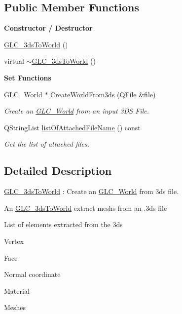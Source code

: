\subsection*{Public Member Functions}
\begin{Indent}{\bf Constructor / Destructor}\par
\begin{DoxyCompactItemize}
\item 
\hyperlink{class_g_l_c__3ds_to_world_a0ba29e8681e634a6ed41fbc696bd4b41}{G\-L\-C\-\_\-3ds\-To\-World} ()
\item 
virtual \hyperlink{class_g_l_c__3ds_to_world_a6bccd12d9499bafb012c33ce09fa7f0c}{$\sim$\-G\-L\-C\-\_\-3ds\-To\-World} ()
\end{DoxyCompactItemize}
\end{Indent}
\begin{Indent}{\bf Set Functions}\par
\begin{DoxyCompactItemize}
\item 
\hyperlink{class_g_l_c___world}{G\-L\-C\-\_\-\-World} $\ast$ \hyperlink{class_g_l_c__3ds_to_world_ab09c0eb5e5decddb6404461bc1b9a1cd}{Create\-World\-From3ds} (Q\-File \&\hyperlink{uavobjecttemplate_8m_a97c04efa65bcf0928abf9260bc5cbf46}{file})
\begin{DoxyCompactList}\small\item\em Create an \hyperlink{class_g_l_c___world}{G\-L\-C\-\_\-\-World} from an input 3\-D\-S File. \end{DoxyCompactList}\item 
Q\-String\-List \hyperlink{class_g_l_c__3ds_to_world_acbcf0801f7136632bd2cc9e69b57b2ad}{list\-Of\-Attached\-File\-Name} () const 
\begin{DoxyCompactList}\small\item\em Get the list of attached files. \end{DoxyCompactList}\end{DoxyCompactItemize}
\end{Indent}


\subsection{Detailed Description}
\hyperlink{class_g_l_c__3ds_to_world}{G\-L\-C\-\_\-3ds\-To\-World} \-: Create an \hyperlink{class_g_l_c___world}{G\-L\-C\-\_\-\-World} from 3ds file. 

An \hyperlink{class_g_l_c__3ds_to_world}{G\-L\-C\-\_\-3ds\-To\-World} extract meshs from an .3ds file \par
 List of elements extracted from the 3ds
\begin{DoxyItemize}
\item Vertex
\item Face
\item Normal coordinate
\item Material
\item Meshes 
\end{DoxyItemize}

